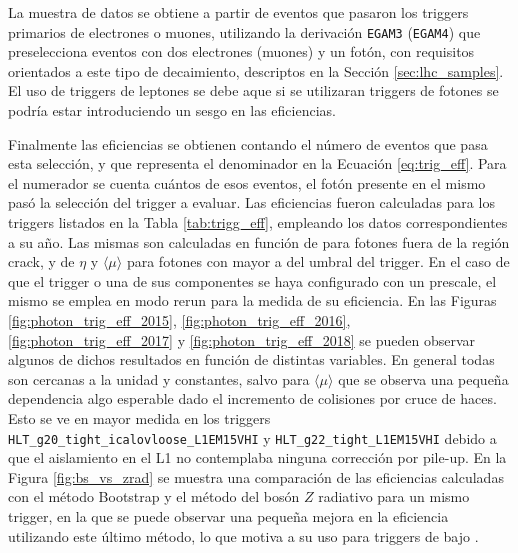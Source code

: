 La muestra de datos se obtiene a partir de eventos que pasaron los triggers primarios de electrones o muones, utilizando la derivación \texttt{EGAM3} (\texttt{EGAM4}) que preselecciona eventos con dos electrones (muones) y un fotón, con requisitos orientados a este tipo de decaimiento, descriptos en la Sección \ref{sec:lhc_samples}. El uso de triggers de leptones se debe aque si se utilizaran triggers de fotones se podría estar introduciendo un sesgo en las eficiencias.

Finalmente las eficiencias se obtienen contando el número de eventos que pasa esta selección, y que representa el denominador en la Ecuación \ref{eq:trig_eff}. Para el numerador se cuenta cuántos de esos eventos, el fotón presente en el mismo pasó la selección del trigger a evaluar. Las eficiencias fueron calculadas para los triggers listados en la Tabla \ref{tab:trigg_eff}, empleando los datos correspondientes a su año. Las mismas son calculadas en función de \ET para fotones fuera de la región crack, y de $\eta$ y $\langle\mu\rangle$ para fotones con \ET mayor a  del umbral del trigger. En el caso de que el trigger o una de sus componentes se haya configurado con un prescale, el mismo se emplea en modo rerun para la medida de su eficiencia. En las Figuras \ref{fig:photon_trig_eff_2015}, \ref{fig:photon_trig_eff_2016}, \ref{fig:photon_trig_eff_2017} y \ref{fig:photon_trig_eff_2018} se pueden observar algunos de dichos resultados en función de distintas variables. En general todas son cercanas a la unidad y constantes, salvo para $\langle\mu\rangle$ que se observa una pequeña dependencia algo esperable dado el incremento de colisiones por cruce de haces. Esto se ve en mayor medida en los triggers \texttt{HLT\_g20\_tight\_icalovloose\_L1EM15VHI} y \texttt{HLT\_g22\_tight\_L1EM15VHI} debido a que 
el aislamiento en el L1 no contemplaba ninguna corrección por pile-up.
En la Figura \ref{fig:bs_vs_zrad} se muestra una comparación de las eficiencias calculadas con el método Bootstrap \cite{tesis_joaco} y el método del bosón $Z$ radiativo para un mismo trigger, en la que se puede observar una pequeña mejora en la eficiencia utilizando este último método, lo que motiva a su uso para triggers de bajo \ET.

